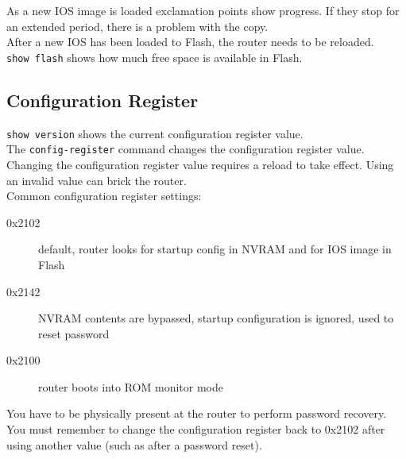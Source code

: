 As a new IOS image is loaded exclamation points show progress. If they stop
for an extended period, there is a problem with the copy.\\

After a new IOS has been loaded to Flash, the router needs to be reloaded.\\

\texttt{show flash} shows how much free space is available in Flash.

\subsection{Configuration Register}

\texttt{show version} shows the current configuration register value.\\

The \texttt{config-register} command changes the configuration register value.
Changing the configuration register value requires a reload to take effect.
Using an invalid value can brick the router.\\

Common configuration register settings:

\begin{description}

\item[0x2102]
default, router looks for startup config in NVRAM and for IOS image in Flash

\item[0x2142]
NVRAM contents are bypassed, startup configuration is ignored, used to reset
password

\item[0x2100]
router boots into ROM monitor mode

\end{description}

You have to be physically present at the router to perform password recovery.\\

You must remember to change the configuration register back to 0x2102 after
using another value (such as after a password reset).
